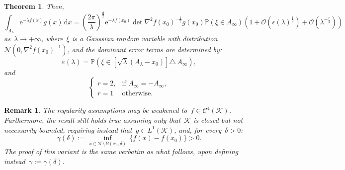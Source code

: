 \documentclass[10pt]{article}
\renewcommand{\d}{\mathrm{d}}
\newcommand{\e}{\mathrm{e}}
\renewcommand{\P}{\mathbb{P}}
\newcommand{\1}{\mathbbm 1}
\renewcommand{\O}{\mathcal{O}}
\newtheorem{theorem}{Theorem}
\newtheorem{remark}{Remark}
\begin{document}
\begin{theorem}
            Then, 
            \begin{equation}
                \label{eq:laplace_asymptotics}
                \int_{A_\lambda} \e^{-\lambda f(x)}g(x)\,\d x = \left(\frac{2\pi}{\lambda}\right)^{\frac d2}\e^{-\lambda f(x_0)}\det \nabla^2 f(x_0)^{-\frac12}g(x_0)\P(\xi \in A_\infty)\left(1+\O(\epsilon(\lambda)^{\frac12}) + \O(\lambda^{-\frac r2})\right)
            \end{equation}
            as~$\lambda\to +\infty$, where~$\xi$ is a Gaussian random variable with distribution~$\mathcal N\left(0,\nabla^2 f(x_0)^{-1}\right)$, and the dominant error terms are determined by:
            $$\varepsilon(\lambda) = \P\left(\xi \in \left[\sqrt\lambda\left(A_\lambda-x_0\right)\right] \triangle\, A_\infty\right),$$
            and
            \[\begin{cases}
                r = 2,& \text{if } A_\infty = -A_\infty,\\
                r =1 & \text{otherwise}.
            \end{cases}
            \]
        \end{theorem}

        \begin{remark}
            The regularity assumptions may be weakened to~$f\in \mathcal C^4(\mathcal K)$.
            Furthermore, the result still holds true assuming only that~$\mathcal K$ is closed but not necessarily bounded, requiring instead that~$g\in L^1(\mathcal K)$, and, for every~$\delta >0$:
            \begin{equation}
                \gamma(\delta) := \underset{x\in \mathcal K \setminus B(x_0,\delta)}{\inf}\, \{f(x)-f(x_0)\}>0.
            \end{equation}
            The proof of this variant is the same verbatim as what follows, upon defining instead~$\gamma := \gamma(\delta)$.
        \end{remark}
    
\end{document}
